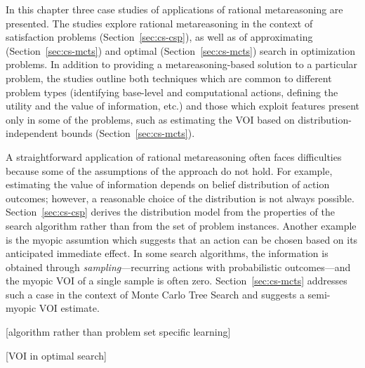 In this chapter three case studies of applications of rational
metareasoning are presented. The studies explore rational
metareasoning in the context of satisfaction problems
(Section~\ref{sec:cs-csp}), as well as of approximating
(Section~\ref{sec:cs-mcts}) and optimal (Section~\ref{sec:cs-mcts})
search in optimization problems. In addition to providing a
metareasoning-based solution to a particular problem, the studies
outline both techniques which are common to different problem types
(identifying base-level and computational actions, 
defining the utility and the value of information, etc.)
and those which exploit features present only in some of the problems,
such as estimating the VOI based on distribution-independent bounds
(Section~\ref{sec:cs-mcts}). 

A straightforward application of rational metareasoning often faces
difficulties because some of the assumptions of the approach do not
hold. For example, estimating the value of information depends on
belief distribution of action outcomes; however, a reasonable choice
of the distribution is not always possible. Section~\ref{sec:cs-csp}
derives the distribution model from the properties of the search
algorithm rather than from the set of problem instances. Another
example is the myopic assumtion \cite{Russell.right} which suggests
that an action can be chosen based on its anticipated immediate
effect. In some search algorithms, the information is obtained through
\emph{sampling}---recurring actions with probabilistic outcomes---and
the myopic VOI of a single sample is often
zero. Section~\ref{sec:cs-mcts} addresses such a case in the context
of Monte Carlo Tree Search and suggests a semi-myopic VOI estimate.

[algorithm rather than problem set specific learning]

[VOI in optimal search]


